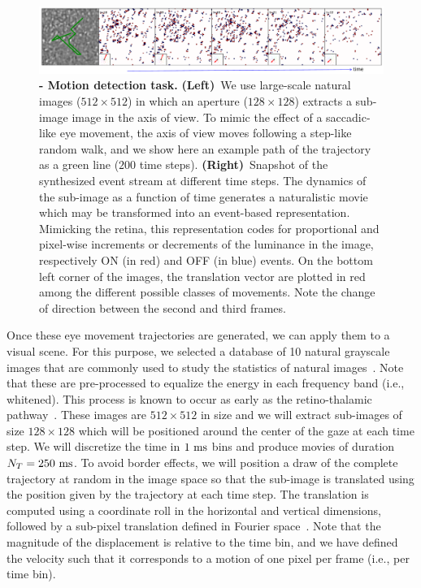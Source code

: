 \documentclass[default]{sn-jnl}%
\theoremstyle{thmstyleone}%
\theoremstyle{thmstyletwo}%
\theoremstyle{thmstylethree}%
\begin{document}
\begin{figure}%
    \centering
    \includegraphics[width=0.95\linewidth]{figures/motion_task.pdf}
    \caption{
    {\bf - Motion detection task.} {\bf (Left)}~We use large-scale natural images ($512\times512$) in which an aperture ($128\times128$) extracts a sub-image image in the axis of view. To mimic the effect of a saccadic-like eye movement, the axis of view moves following a step-like random walk, and we show here an example path of the trajectory as a green line ($200$ time steps). {\bf (Right)}~Snapshot of the synthesized event stream at different time steps. The dynamics of the sub-image as a function of time generates a naturalistic movie which may be transformed into an event-based representation. Mimicking the retina, this representation codes for proportional and pixel-wise increments or decrements of the luminance in the image, respectively ON (in red) and OFF (in blue) events. On the bottom left corner of the images, the translation vector are plotted in red among the different possible classes of movements. Note the change of direction between the second and third frames.}
    \label{fig:motion_task}
\end{figure}
Once these eye movement trajectories are generated, we can apply them to a visual scene. For this purpose, we selected a database of 10 natural grayscale images that are commonly used to study the statistics of natural images~\citep{olshausen_emergence_1996}. Note that these are pre-processed to equalize the energy in each frequency band (i.e., whitened). This process is known to occur as early as the retino-thalamic pathway~\citep{dan_efficient_1996}. These images are $512 \times 512$ in size and we will extract sub-images of size $128 \times 128$ which will be positioned around the center of the gaze at each time step. We will discretize the time in $1~\si{\milli\second}$ bins and produce movies of duration $N_T = 250~\si{\milli\second}$. To avoid border effects, we will position a draw of the complete trajectory at random in the image space so that the sub-image is translated using the position given by the trajectory at each time step. The translation is computed using a coordinate roll in the horizontal and vertical dimensions, followed by a sub-pixel translation defined in Fourier space~\citep{perrinet_sparse_2015}. Note that the magnitude of the displacement is relative to the time bin, and we have defined the velocity such that it corresponds to a motion of one pixel per frame (i.e., per time bin).
\end{document}
